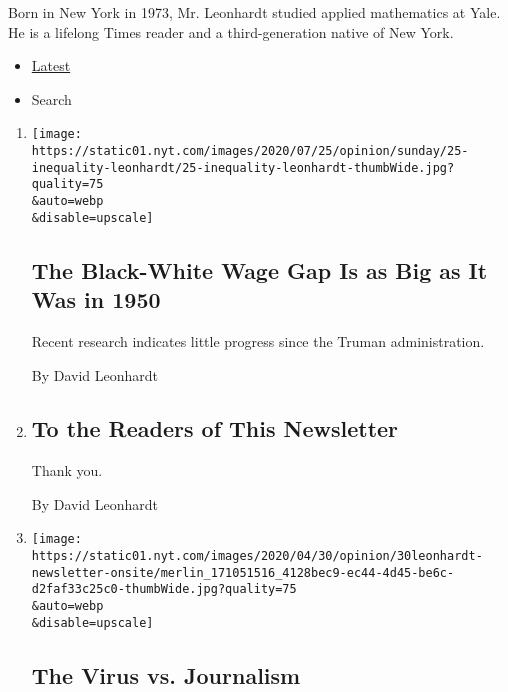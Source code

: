 Born in New York in 1973, Mr. Leonhardt studied applied mathematics at
Yale. He is a lifelong Times reader and a third-generation native of New
York.

\begin{itemize}
\tightlist
\item
  \protect\hyperlink{stream-panel}{Latest}
\item
  Search
\end{itemize}

\begin{enumerate}
\def\labelenumi{\arabic{enumi}.}
\item
  \href{/2020/06/25/opinion/sunday/race-wage-gap.html}{}

  \texttt{[image: https://static01.nyt.com/images/2020/07/25/opinion/sunday/25-inequality-leonhardt/25-inequality-leonhardt-thumbWide.jpg?quality=75\\\&auto=webp\\\&disable=upscale]}

  \hypertarget{the-black-white-wage-gap-is-as-big-as-it-was-in-1950}{%
  \subsection{The Black-White Wage Gap Is as Big as It Was in
  1950}\label{the-black-white-wage-gap-is-as-big-as-it-was-in-1950}}

  Recent research indicates little progress since the Truman
  administration.

  By David Leonhardt
\item
  \href{/2020/05/01/opinion/david-leonhardt-newsletter.html}{}

  \hypertarget{to-the-readers-of-this-newsletter}{%
  \subsection{To the Readers of This
  Newsletter}\label{to-the-readers-of-this-newsletter}}

  Thank you.

  By David Leonhardt
\item
  \href{/2020/04/30/opinion/journalists-newspapers-coronavirus.html}{}

  \texttt{[image: https://static01.nyt.com/images/2020/04/30/opinion/30leonhardt-newsletter-onsite/merlin\_171051516\_4128bec9-ec44-4d45-be6c-d2faf33c25c0-thumbWide.jpg?quality=75\\\&auto=webp\\\&disable=upscale]}

  \hypertarget{the-virus-vs-journalism}{%
  \subsection{The Virus vs. Journalism}\label{the-virus-vs-journalism}}


\end{enumerate}
